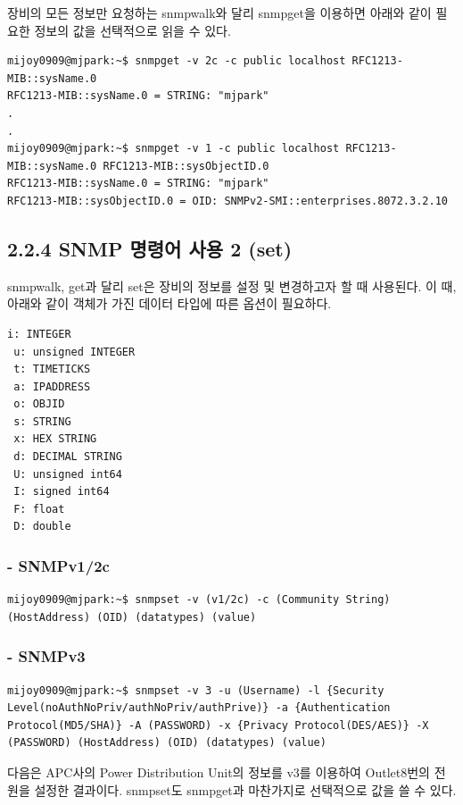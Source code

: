 \documentclass[11pt
  , a4paper
  , article
  , oneside
]{memoir}
\begin{document}
장비의 모든 정보만 요청하는 snmpwalk와 달리 snmpget을 이용하면 아래와 같이 필요한 정보의 값을 선택적으로 읽을 수 있다.
\begin{lstlisting}[style=termstyle]
mijoy0909@mjpark:~$ snmpget -v 2c -c public localhost RFC1213-MIB::sysName.0
RFC1213-MIB::sysName.0 = STRING: "mjpark"
.
.
mijoy0909@mjpark:~$ snmpget -v 1 -c public localhost RFC1213-MIB::sysName.0 RFC1213-MIB::sysObjectID.0
RFC1213-MIB::sysName.0 = STRING: "mjpark"
RFC1213-MIB::sysObjectID.0 = OID: SNMPv2-SMI::enterprises.8072.3.2.10
\end{lstlisting}

\subsection{2.2.4 SNMP 명령어 사용 2 (set)}

snmpwalk, get과 달리 set은 장비의 정보를 설정 및 변경하고자 할 때 사용된다. 이 때, 아래와 같이 객체가 가진 데이터 타입에 따른 옵션이 필요하다.

\begin{lstlisting}[style=termstyle]
 i: INTEGER 
 u: unsigned INTEGER 
 t: TIMETICKS
 a: IPADDRESS
 o: OBJID
 s: STRING
 x: HEX STRING
 d: DECIMAL STRING
 U: unsigned int64
 I: signed int64
 F: float
 D: double
\end{lstlisting}

\subsubsection{- SNMPv1/2c}

\begin{lstlisting}[style=termstyle]
mijoy0909@mjpark:~$ snmpset -v (v1/2c) -c (Community String) (HostAddress) (OID) (datatypes) (value)
\end{lstlisting}

\subsubsection{- SNMPv3}

\begin{lstlisting}[style=termstyle]
mijoy0909@mjpark:~$ snmpset -v 3 -u (Username) -l {Security Level(noAuthNoPriv/authNoPriv/authPrive)} -a {Authentication Protocol(MD5/SHA)} -A (PASSWORD) -x {Privacy Protocol(DES/AES)} -X (PASSWORD) (HostAddress) (OID) (datatypes) (value)
\end{lstlisting}

다음은 APC사의 Power Distribution Unit의 정보를 v3를 이용하여 Outlet8번의 전원을 설정한 결과이다. snmpset도 snmpget과 마찬가지로 선택적으로 값을 쓸 수 있다.
\end{document}
